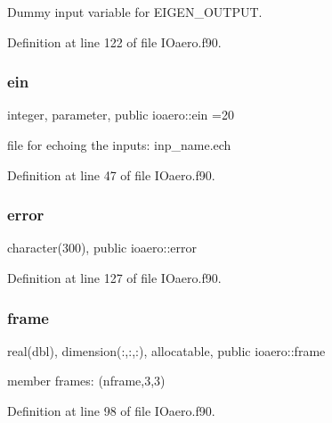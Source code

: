 Dummy input variable for E\+I\+G\+E\+N\+\_\+\+O\+U\+T\+P\+UT. 



Definition at line 122 of file I\+Oaero.\+f90.

\mbox{\label{namespaceioaero_a6a4b9f5362e2eee64e5777786065f563}} 
\subsubsection{\texorpdfstring{ein}{ein}}
{\footnotesize\ttfamily integer, parameter, public ioaero\+::ein =20}



file for echoing the inputs\+: inp\+\_\+name.\+ech 



Definition at line 47 of file I\+Oaero.\+f90.

\mbox{\label{namespaceioaero_aebd85ae2a176f49a7213d8ed7b68f887}} 
\subsubsection{\texorpdfstring{error}{error}}
{\footnotesize\ttfamily character(300), public ioaero\+::error}



Definition at line 127 of file I\+Oaero.\+f90.

\mbox{\label{namespaceioaero_a26d467b1adbb838f4b1ba3dd4ee1ea0d}} 
\subsubsection{\texorpdfstring{frame}{frame}}
{\footnotesize\ttfamily real(dbl), dimension(\+:,\+:,\+:), allocatable, public ioaero\+::frame}



member frames\+: (nframe,3,3) 



Definition at line 98 of file I\+Oaero.\+f90.

\mbox{\label{namespaceioaero_a831fe87d45ef05e3e29a8c4c2fc88c8f}} 
